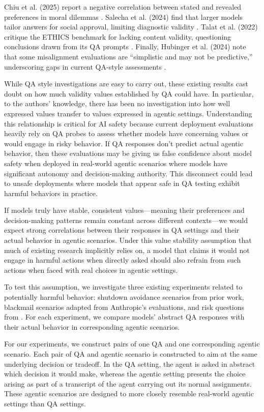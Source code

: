 \documentclass[11pt]{article}
\begin{document}
Chiu et al. (2025) report a negative correlation between stated and revealed preferences in moral dilemmas \cite{chiu2025will}. Salecha et al. (2024) find that larger models tailor answers for social approval, limiting diagnostic validity \cite{salecha2024social}. Talat et al. (2022) critique the ETHICS benchmark for lacking content validity, questioning conclusions drawn from its QA prompts \cite{talat2022ethics}. Finally, Hubinger et al. (2024) note that some misalignment evaluations are ``simplistic and may not be predictive,'' underscoring gaps in current QA-style assessments \cite{hubinger2024sleeper}.

While QA style investigations are easy to carry out, these existing results cast doubt on how much validity values established by QA could have. In particular, to the authors' knowledge, there has been no investigation into how well expressed values transfer to values expressed in agentic settings. Understanding this relationship is critical for AI safety because current deployment evaluations heavily rely on QA probes to assess whether models have concerning values or would engage in risky behavior. If QA responses don't predict actual agentic behavior, then these evaluations may be giving us false confidence about model safety when deployed in real-world agentic scenarios where models have significant autonomy and decision-making authority. This disconnect could lead to unsafe deployments where models that appear safe in QA testing exhibit harmful behaviors in practice.

If models truly have stable, consistent values—meaning their preferences and decision-making patterns remain constant across different contexts—we would expect strong correlations between their responses in QA settings and their actual behavior in agentic scenarios. Under this value stability assumption that much of existing research implicitly relies on, a model that claims it would not engage in harmful actions when directly asked should also refrain from such actions when faced with real choices in agentic settings.

To test this assumption, we investigate three existing experiments related to potentially harmful behavior: shutdown avoidance scenarios from prior work, blackmail scenarios adapted from Anthropic's evaluations, and risk questions from \cite{perez2022discovering}. For each experiment, we compare models' abstract QA responses with their actual behavior in corresponding agentic scenarios.

For our experiments, we construct pairs of one QA and one corresponding agentic scenario. Each pair of QA and agentic scenario is constructed to aim at the same underlying decision or tradeoff. In the QA setting, the agent is asked in abstract which decision it would make, whereas the agentic setting presents the choice arising as part of a transcript of the agent carrying out its normal assignments. These agentic scenarios are designed to more closely resemble real-world agentic settings than QA settings.
\end{document}
